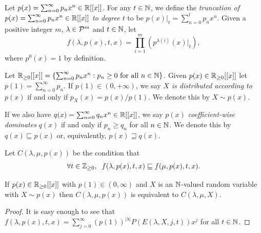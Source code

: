 \documentclass[12pt]{article}
\begin{document}
Let $p(x) = \sum_{n=0}^\infty p_n x^n \in \mathbb{R}[[x]]$.  For any $t \in \mathbb{N}$, we define the \emph{truncation of $p(x) = \sum_{n=0}^\infty p_n x^n \in \mathbb{R}[[x]]$ to degree $t$} to be $p(x)|_t = \sum_{n=0}^t p_n x^n$. Given a positive integer $m$, $\lambda \in {\cal P}^m$ and $t \in \mathbb{N}$, let \[f(\lambda,p(x),t,x) = \prod_{i=1}^m (p^{\lambda(i)}(x)|_t),\] where $p^0(x) = 1$ by definition.  

Let $\mathbb{R}_{\geq 0}[[x]] = \{ \sum_{n=0}^\infty p_n x^n : p_n \geq 0 \text{ for all $n \in \mathbb{N}$}\}$.  Given $p(x) \in \mathbb{R}_{\geq 0}[[x]]$ let $p(1) = \sum_{n=0}^\infty p_n$. If $p(1) \in (0, +\infty)$, we say \emph{$X$ is distributed according to $p(x)$} if and only if $p_X(x) = p(x)/p(1)$. We denote this by $X \sim p(x)$.

If we also have $q(x) = \sum_{n=0}^\infty q_n x^n \in \mathbb{R}[[x]]$, we say $p(x)$ \emph{coefficient-wise dominates} $q(x)$ if and only if $p_n \geq q_n$ for all $n \in \mathbb{N}$.  We denote this by $q(x) \sqsubseteq p(x)$ or, equivalently, $p(x) \sqsupseteq q(x)$.

Let $C(\lambda,\mu,p(x))$ be the condition that \[ \forall t \in \mathbb{Z}_{\geq 0}, \; \; f(\lambda,p(x),t,x) \sqsubseteq f(\mu,p(x),t,x).\]  

\begin{lemma} \label{L:generating} If $p(x) \in \mathbb{R}_{\geq 0}[[x]]$ with $p(1) \in (0, \infty)$ and $X$ is an $\mathbb{N}$-valued random variable with $X \sim p(x)$ then $C(\lambda,\mu,p(x))$ is equivalent to $C(\lambda,\mu,X)$.

\end{lemma}

\begin{proof}  It is easy enough to see that $f(\lambda,p(x),t,x) = \sum_{j=0}^\infty (p(1))^{|\lambda|} P(E(\lambda,X,j,t)) x^j$ for all $t \in \mathbb{N}$. \end{proof}
\end{document}

